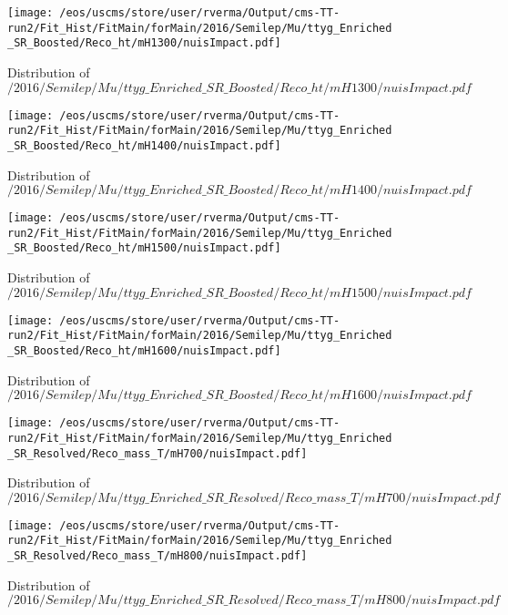 \begin{figure}
\centering
\texttt{[image: /eos/uscms/store/user/rverma/Output/cms-TT-run2/Fit\_Hist/FitMain/forMain/2016/Semilep/Mu/ttyg\_Enriched\_SR\_Boosted/Reco\_ht/mH1300/nuisImpact.pdf]}
\caption{Distribution of $/2016/Semilep/Mu/ttyg\_Enriched\_SR\_Boosted/Reco\_ht/mH1300/nuisImpact.pdf$}
\end{figure}

\begin{figure}
\centering
\texttt{[image: /eos/uscms/store/user/rverma/Output/cms-TT-run2/Fit\_Hist/FitMain/forMain/2016/Semilep/Mu/ttyg\_Enriched\_SR\_Boosted/Reco\_ht/mH1400/nuisImpact.pdf]}
\caption{Distribution of $/2016/Semilep/Mu/ttyg\_Enriched\_SR\_Boosted/Reco\_ht/mH1400/nuisImpact.pdf$}
\end{figure}

\begin{figure}
\centering
\texttt{[image: /eos/uscms/store/user/rverma/Output/cms-TT-run2/Fit\_Hist/FitMain/forMain/2016/Semilep/Mu/ttyg\_Enriched\_SR\_Boosted/Reco\_ht/mH1500/nuisImpact.pdf]}
\caption{Distribution of $/2016/Semilep/Mu/ttyg\_Enriched\_SR\_Boosted/Reco\_ht/mH1500/nuisImpact.pdf$}
\end{figure}

\begin{figure}
\centering
\texttt{[image: /eos/uscms/store/user/rverma/Output/cms-TT-run2/Fit\_Hist/FitMain/forMain/2016/Semilep/Mu/ttyg\_Enriched\_SR\_Boosted/Reco\_ht/mH1600/nuisImpact.pdf]}
\caption{Distribution of $/2016/Semilep/Mu/ttyg\_Enriched\_SR\_Boosted/Reco\_ht/mH1600/nuisImpact.pdf$}
\end{figure}

\begin{figure}
\centering
\texttt{[image: /eos/uscms/store/user/rverma/Output/cms-TT-run2/Fit\_Hist/FitMain/forMain/2016/Semilep/Mu/ttyg\_Enriched\_SR\_Resolved/Reco\_mass\_T/mH700/nuisImpact.pdf]}
\caption{Distribution of $/2016/Semilep/Mu/ttyg\_Enriched\_SR\_Resolved/Reco\_mass\_T/mH700/nuisImpact.pdf$}
\end{figure}

\begin{figure}
\centering
\texttt{[image: /eos/uscms/store/user/rverma/Output/cms-TT-run2/Fit\_Hist/FitMain/forMain/2016/Semilep/Mu/ttyg\_Enriched\_SR\_Resolved/Reco\_mass\_T/mH800/nuisImpact.pdf]}
\caption{Distribution of $/2016/Semilep/Mu/ttyg\_Enriched\_SR\_Resolved/Reco\_mass\_T/mH800/nuisImpact.pdf$}
\end{figure}

